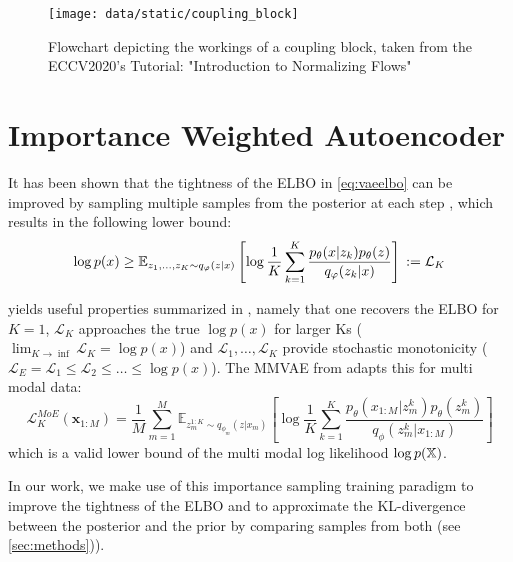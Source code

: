 \begin{figure}
    \centering
    \texttt{[image: data/static/coupling\_block]}
    \caption{Flowchart depicting the workings of a coupling block, taken from the ECCV2020's Tutorial: "Introduction to Normalizing Flows" \citep{coupling_blocks}}
    \label{fig:coupling block}
\end{figure}


\section{Importance Weighted Autoencoder} \label{subsec:iwvae}
It has been shown that the tightness of the ELBO in \cref{eq:vaeelbo} can be improved by sampling multiple samples from the posterior at each step \parencite{burda_importance_2016}, which results in the following lower bound:
\begin{equation}
    \label{eq:iwelbo}
    \log p(x) \geq \mathbb{E}_{z_1,\ldots,z_K \sim q_{\phi}(z|x)}\left[ \log \frac{1}{K} \sum ^K _{k=1} \frac{p_{\theta}(x|z_k)p_{\theta}(z)}{q_{\phi}(z_k| x)} \right]\\
    := \mathcal{L}_K
\end{equation}

 yields useful properties summarized in \parencite{nowozin_debiasing_2018}, namely that one recovers the ELBO for $K=1$, $\mathcal{L}_K$ approaches the true $\log p(x)$ for larger Ks ($\lim _{K \rightarrow \inf} \mathcal{L}_K = \log p(x)$) and $\mathcal{L}_1, \ldots, \mathcal{L}_K$ provide stochastic monotonicity ($\mathcal{L}_E = \mathcal{L}_1 \leq \mathcal{L}_2 \leq \ldots \leq \log p(x)$).
The MMVAE from \parencite{shi2019variational} adapts this for multi modal data:
\begin{equation}
    \label{eq:iwelbommvae}
    \mathcal{L}^{MoE}_K(\textbf{x}_{1:M}) =
    \frac{1}{M} \sum _{m=1} ^M \mathbb{E}_{z_m^{1:K} \sim q_{\phi_m}(z|x_m)}\left[ \log \frac{1}{K} \sum ^K _{k=1} \frac{p_{\theta}(x_{1:M}|z_m^k)p_{\theta}(z^k_m)}{q_{\phi}(z_m^k| x_{1:M})} \right]
\end{equation}
which is a valid lower bound of the multi modal log likelihood $\log p(\mathbb{X})$.

In our work, we make use of this importance sampling training paradigm to improve the tightness of the ELBO and to approximate the KL-divergence between the posterior and the prior by comparing samples from both (see \cref{sec:methods})).

